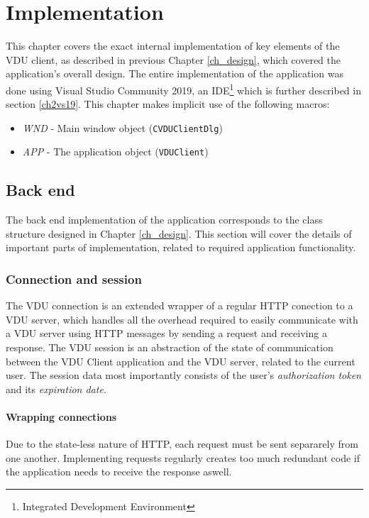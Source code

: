 \chapter{Implementation}
\label{ch_implementation}
This chapter covers the exact internal implementation of key elements of the VDU client, as described in previous Chapter \ref{ch_design}, which covered the application's overall design. The entire implementation of the application was done using Visual Studio Community 2019, an IDE\footnote{Integrated Development Environment} which is further described in section \ref{ch2vs19}. This chapter makes implicit use of the following macros:
\begin{itemize}
    \item \textit{WND} - Main window object (\lstinline{CVDUClientDlg})
    \item \textit{APP} - The application object (\lstinline{VDUClient})
\end{itemize}

\section{Back end}
The back end implementation of the application corresponds to the class structure designed in Chapter \ref{ch_design}. This section will cover the details of important parts of implementation, related to required application functionality.

\subsection{Connection and session}
The VDU connection is an extended wrapper of a regular HTTP conection to a VDU server, which handles all the overhead required to easily communicate with a VDU server using HTTP messages by sending a request and receiving a response. The VDU session is an abstraction of the state of communication between the VDU Client application and the VDU server, related to the current user. The session data most importantly consists of the user's \textit{authorization token} and its \textit{expiration date}. 

\subsubsection{Wrapping connections}
Due to the state-less nature of HTTP, each request must be sent separarely from one another. Implementing requests regularly creates too much redundant code if the application needs to receive the response aswell. 

